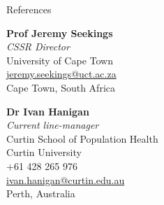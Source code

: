 \begin{rSection}{References}
\begin{multicols}{2}
{\textbf{Prof Jeremy Seekings}}\\
{\textit{CSSR Director}}\\
{University of Cape Town}\\
\href{mailto:jeremy.seekings@uct.ac.za}{jeremy.seekings@uct.ac.za}\\
{Cape Town, South Africa}\par

{\textbf{Dr Ivan Hanigan}}\\
{\textit{Current line-manager}}\\
{Curtin School of Population Health}\\
{Curtin University}\\
{+61 428 265 976}\\
\href{mailto:ivan.hanigan@curtin.edu.au}{ivan.hanigan@curtin.edu.au}\\
{Perth, Australia}\par

\end{multicols}

\end{rSection}
